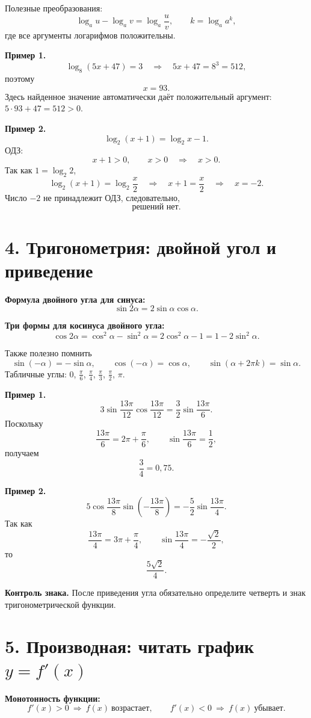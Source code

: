 \documentclass[a4paper,12pt]{article}
\newcommand{\key}[1]{\textcolor{darkaccent}{\textbf{#1}}}
\begin{document}
Полезные преобразования:
\[
\log_a u-\log_a v=\log_a\frac{u}{v},
\qquad
k=\log_a a^k,
\]
где все аргументы логарифмов положительны.

\textbf{Пример 1.}
\[
\log_8(5x+47)=3
\quad\Longrightarrow\quad
5x+47=8^3=512,
\]
поэтому
\[
\boxed{x=93}.
\]
Здесь найденное значение автоматически даёт положительный аргумент: $5\cdot93+47=512>0$.

\textbf{Пример 2.}
\[
\log_2(x+1)=\log_2 x-1.
\]
ОДЗ:
\[
x+1>0,\qquad x>0
\quad\Longrightarrow\quad x>0.
\]
Так как $1=\log_2 2$,
\[
\log_2(x+1)=\log_2\frac{x}{2}
\quad\Longrightarrow\quad
x+1=\frac{x}{2}
\quad\Longrightarrow\quad
x=-2.
\]
Число $-2$ не принадлежит ОДЗ, следовательно,
\[
\boxed{\text{решений нет}}.
\]

\section{4. Тригонометрия: двойной угол и приведение}

\key{Формула двойного угла для синуса:}
\[
\boxed{\sin 2\alpha=2\sin\alpha\cos\alpha}.
\]

\key{Три формы для косинуса двойного угла:}
\[
\boxed{
\cos2\alpha
=\cos^2\alpha-\sin^2\alpha
=2\cos^2\alpha-1
=1-2\sin^2\alpha.}
\]

Также полезно помнить
\[
\sin(-\alpha)=-\sin\alpha,
\qquad
\cos(-\alpha)=\cos\alpha,
\qquad
\sin(\alpha+2\pi k)=\sin\alpha.
\]
Табличные углы: $0$, $\frac{\pi}{6}$, $\frac{\pi}{4}$, $\frac{\pi}{3}$, $\frac{\pi}{2}$, $\pi$.

\textbf{Пример 1.}
\[
3\sin\frac{13\pi}{12}\cos\frac{13\pi}{12}
=\frac32\sin\frac{13\pi}{6}.
\]
Поскольку
\[
\frac{13\pi}{6}=2\pi+\frac{\pi}{6},
\qquad
\sin\frac{13\pi}{6}=\frac12,
\]
получаем
\[
\boxed{\frac34=0,75}.
\]

\textbf{Пример 2.}
\[
5\cos\frac{13\pi}{8}\sin\!\left(-\frac{13\pi}{8}\right)
=-\frac52\sin\frac{13\pi}{4}.
\]
Так как
\[
\frac{13\pi}{4}=3\pi+\frac{\pi}{4},
\qquad
\sin\frac{13\pi}{4}=-\frac{\sqrt2}{2},
\]
то
\[
\boxed{\frac{5\sqrt2}{4}}.
\]

\key{Контроль знака.} После приведения угла обязательно определите четверть и знак тригонометрической функции.

\section{5. Производная: читать график $y=f'(x)$}

\key{Монотонность функции:}
\[
f'(x)>0\ \Longrightarrow\ f(x)\ \text{возрастает},
\qquad
f'(x)<0\ \Longrightarrow\ f(x)\ \text{убывает}.
\]
\end{document}
